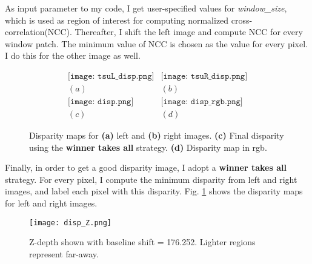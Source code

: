 \documentclass[11pt]{article}
\begin{document}
 \par As input parameter to my code, I get user-specified values for \emph{window\_size}, which is used as region of interest for computing normalized cross-correlation(NCC). Thereafter, I shift the left image and compute NCC for every window patch. The minimum value of NCC is chosen as the value for every pixel. I do this for the other image as well. 
 \vspace{-10pt}
 \begin{figure}[!hbt]
\vspace{-10pt}
 \begin{center}
  \[ \begin{array}{ccc}
	  \texttt{[image: tsuL\_disp.png]} &
	  \texttt{[image: tsuR\_disp.png]} \\ 
	  (a) & (b) \\
	  \texttt{[image: disp.png]} &
	  \texttt{[image: disp\_rgb.png]} \\
	  (c) & (d) 
	  \end{array} \]
  \end{center}
  \vspace{-10pt}
  \caption{ Disparity maps for {\bf (a)} left and {\bf (b)} right images. {\bf (c)} Final disparity using the \textbf{winner takes all} strategy. {\bf (d)} Disparity map in rgb.}
  \label{fig6}
    \vspace{-10pt}
\end{figure}

\par Finally, in order to get a good disparity image, I adopt a \textbf{winner takes all} strategy. For every pixel, I compute the minimum disparity from left and right images, and label each pixel with this disparity. Fig. \ref{fig6} shows the disparity maps for left and right  images.

\begin{figure}[!hbt]
\vspace{-10pt}
  \texttt{[image: disp\_Z.png]}
  \caption{Z-depth shown with baseline shift = 176.252. Lighter regions represent far-away.}
  \vspace{-10pt}
  \label{fig7}
\end{figure}
 
 
\end{document}
